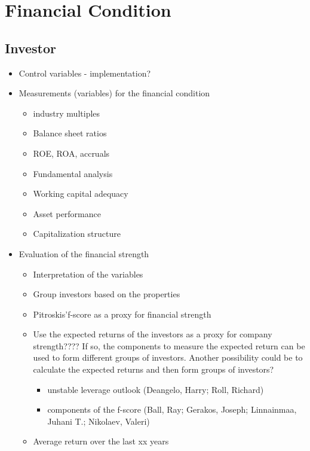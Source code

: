 \documentclass[12pt]{article}
\begin{document}
\section{Financial Condition}

\subsection{Investor}

    \begin{itemize}
        \item Control variables - implementation?
    
        \item Measurements (variables) for the financial condition 
    
            \begin{itemize}
            \item industry multiples
            \item Balance sheet ratios
            \item ROE, ROA, accruals 
            \item Fundamental analysis
            \item Working capital adequacy
            \item Asset performance
            \item Capitalization structure
            \end{itemize}
    
        \item Evaluation of the financial strength
    
            \begin{itemize}
            \item Interpretation of the variables
            \item Group investors based on the properties
            \item Pitroskis'f-score as a proxy for financial strength
            \item Use the expected returns of the investors as a proxy for company strength???? If so, the components to measure the expected return can be used to form different groups of investors. Another possibility could be to calculate the expected returns and then form groups of investors? 

            \begin{itemize}
                \item unstable leverage outlook (Deangelo, Harry; Roll, Richard)
                \item components of the f-score (Ball, Ray; Gerakos, Joseph; Linnainmaa, Juhani T.; Nikolaev, Valeri)
                
                
            \end{itemize}
            \item Average return over the last xx years 
            \end{itemize}

    
    \end{itemize}
\end{document}

